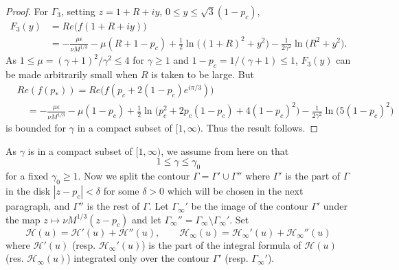 \documentclass[11pt]{article}
\begin{document}
\begin{proof}
For $\Gamma_3$, setting $z=1+R+iy$,  $0\le y\le
\sqrt{3}(1-p_c)$,
\begin{equation}
\begin{split}
  F_3(y) &= Re\bigl(f (1+R+iy)\bigr) \\
  &= -\frac{\mu\epsilon}{\nu M^{1/3}} -\mu(R+1-p_c) + \frac12 \ln\bigl( (1+R)^2+y^2\bigr)
  - \frac1{2\gamma^2} \ln\bigr( R^2+y^2\bigr).
\end{split}
\end{equation}
As $1\le \mu=(\gamma+1)^2/\gamma^2\le 4$ for $\gamma\ge 1$ and
$1-p_c=1/(\gamma+1)\le 1$, $F_3(y)$ can be made arbitrarily small
when $R$ is taken to be large. But
\begin{equation}
\begin{split}
   & Re (f(p_*))= Re \bigl(f(p_c+2(1-p_c)e^{i\pi/3})\bigr) \\
   &\quad = -\frac{\mu\epsilon}{\nu M^{1/3}} -\mu (1-p_c) + \frac12\ln\bigl( p_c^2+ 2p_c(1-p_c) +
   4(1-p_c)^2\bigr)
   - \frac1{2\gamma^2} \ln \bigl(5(1-p_c)^2\bigr)
\end{split}
\end{equation}
is bounded for $\gamma$ in a compact subset of $[1,\infty)$. Thus
the result follows.
\end{proof}

As $\gamma$ is in a compact subset of $[1,\infty)$, we assume from
here on that
\begin{equation}
   1\le \gamma\le \gamma_0
\end{equation}
for a fixed $\gamma_0\ge 1$. Now we split the contour
$\Gamma=\Gamma'\cup\Gamma''$ where $\Gamma'$ is the part of
$\Gamma$ in the disk $|z-p_c| < \delta$ for some $\delta>0$ which
will be chosen in the next paragraph, and $\Gamma''$ is the rest
of $\Gamma$. Let $\Gamma_{\infty}'$ be the image of the contour
$\Gamma'$ under the map $z\mapsto \nu M^{1/3}(z-p_c)$ and let
$\Gamma_{\infty}''=\Gamma_\infty\setminus \Gamma_\infty'$. Set
\begin{equation}
  \mathcal{H}(u)=\mathcal{H}'(u)+ \mathcal{H}''(u),
  \qquad \mathcal{H}_\infty(u)=\mathcal{H}_\infty'(u)+ \mathcal{H}_\infty''(u)
\end{equation}
where $\mathcal{H}'(u)$ (resp. $\mathcal{H}_\infty'(u)$) is the
part of the integral formula of $\mathcal{H}(u)$ (res.
$\mathcal{H}_\infty(u)$) integrated only over the contour $\Gamma'$
(resp. $\Gamma_{\infty}'$).
\end{document}
